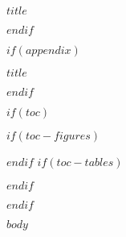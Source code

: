 \documentclass[letterpaper,12pt]{article}
\begin{document}
\newpage

\begin{center}
{\bfseries $title$}
\end{center}

$endif$

$if(appendix)$
\begin{center}
{\LARGE\bfseries $title$}
\end{center}
$endif$

$if(toc)$
{
\hypersetup{linkcolor=black}
\setcounter{tocdepth}{$toc-depth$}
\tableofcontents
$if(toc-figures)$
\listoffigures
$endif$
$if(toc-tables)$
\listoftables
$endif$
}
$endif$

\doublespacing

$body$

\newpage
\singlespacing
\newrefcontext[sorting=nyt]  %
\printbibliography[heading=bibliography$if(reference-section-title)$, title=$reference-section-title$$endif$]

\newpage
\theendnotes
\end{document}

